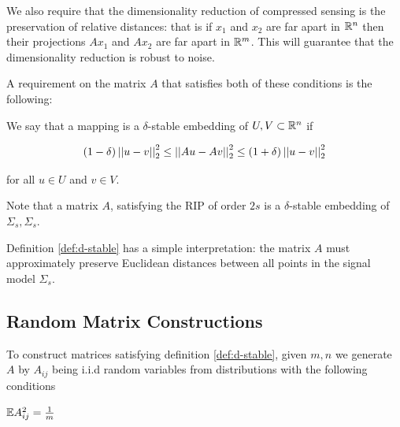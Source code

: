 \documentclass{article}
\begin{document}
\begin{remark} [Stability] \cite{baraniuk2010low}
We also require that the dimensionality reduction of compressed sensing is the preservation of relative distances: that is if \(x_1\) and \(x_2\) are far apart in \({\mathbb{R}}^n\) then their projections \(Ax_1\) and \(Ax_2\) are far apart in \({\mathbb{R}}^m\). This will guarantee that the dimensionality reduction is robust to noise. 
\end{remark}

A requirement on the matrix \(A\) that satisfies both of these conditions is the following:

\begin{definition}
We say that a mapping is a \(\delta\)-stable embedding of \(U,V \subset {\mathbb{R}}^n\) if

\begin{equation}
\left(1 - \delta \right) \left|\left|u-v\right|\right|_2^2 \leq \left|\left|Au-Av\right|\right|_2^2 \leq \left(1 + \delta\right) \left|\left|u-v\right|\right|_2^2
\end{equation}

for all \(u \in U\) and \(v \in V\). 
\label{def:d-stable}
\end{definition} 

\begin{remark}
Note that a matrix \(A\), satisfying the RIP of order \(2s\) is a \(\delta\)-stable embedding of \(\Sigma_s, \Sigma_s\). 
\end{remark}

\begin{remark}
Definition \ref{def:d-stable} has a simple interpretation: the matrix \(A\) must approximately preserve Euclidean distances between all points in the signal model \(\Sigma_s\).
\end{remark}

\subsection{Random Matrix Constructions} \label{sec:mtx-contruction}

To construct matrices satisfying definition \ref{def:d-stable}, given \(m, n\) we generate \(A\) by \(A_{ij}\) being i.i.d random variables from distributions with the following conditions \cite{davenport2010signal}

\begin{condition}
\({\mathbb{E}} A_{ij}^2 = \frac{1}{m}\)
\label{cond:norm-pres}
\end{condition}
\end{document}
